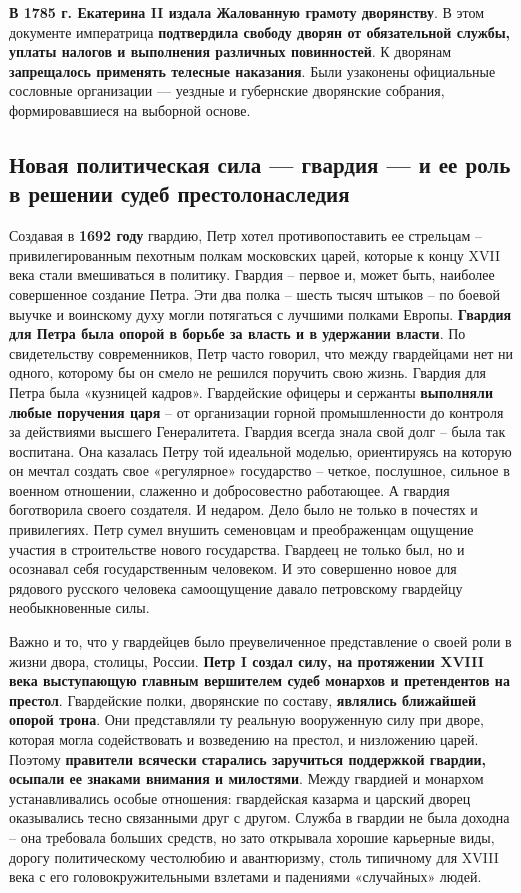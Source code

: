 \documentclass{article}
\begin{document}
\hfill

\textbf{В 1785 г. Екатерина II издала Жалованную грамоту дворянству}. В этом документе императрица \textbf{подтвердила свободу дворян от обязательной службы, уплаты налогов и выполнения различных повинностей}. К дворянам \textbf{запрещалось применять телесные наказания}. Были узаконены официальные   сословные организации — уездные и губернские дворянские собрания, формировавшиеся на выборной основе.

\subsection{Новая политическая сила — гвардия — и ее роль в решении судеб престолонаследия}

Создавая в \textbf{1692 году} гвардию, Петр хотел противопоставить ее стрельцам – привилегированным пехотным полкам московских царей, которые к концу XVII века стали вмешиваться в политику. Гвардия – первое и, может быть, наиболее совершенное создание Петра. Эти два полка – шесть тысяч штыков – по боевой выучке и воинскому духу могли потягаться с лучшими полками Европы. \textbf{Гвардия для Петра была опорой в борьбе за власть и в удержании власти}. По свидетельству современников, Петр часто говорил, что между гвардейцами нет ни одного, которому бы он смело не решился поручить свою жизнь. Гвардия для Петра была «кузницей кадров». Гвардейские офицеры и сержанты \textbf{выполняли любые поручения царя} – от организации горной промышленности до контроля за действиями высшего Генералитета. Гвардия всегда знала свой долг – была так воспитана. Она казалась Петру той идеальной моделью, ориентируясь на которую он мечтал создать свое «регулярное» государство – четкое, послушное, сильное в военном отношении, слаженно и добросовестно работающее. А гвардия боготворила своего создателя. И недаром. Дело было не только в почестях и привилегиях. Петр сумел внушить семеновцам и преображенцам ощущение участия в строительстве нового государства. Гвардеец не только был, но и осознавал себя государственным человеком. И это совершенно новое для рядового русского человека самоощущение давало петровскому гвардейцу необыкновенные силы.

\hfill

Важно и то, что у гвардейцев было преувеличенное представление о своей роли в жизни двора, столицы, России. \textbf{Петр I создал силу, на протяжении XVIII века выступающую главным вершителем судеб монархов и претендентов на престол}. Гвардейские полки, дворянские по составу, \textbf{являлись ближайшей опорой трона}. Они представляли ту реальную вооруженную силу при дворе, которая могла содействовать и возведению на престол, и низложению царей. Поэтому \textbf{правители всячески старались заручиться поддержкой гвардии, осыпали ее знаками внимания и милостями}. Между гвардией и монархом устанавливались особые отношения: гвардейская казарма и царский дворец оказывались тесно связанными друг с другом. Служба в гвардии не была доходна – она требовала больших средств, но зато открывала хорошие карьерные виды, дорогу политическому честолюбию и авантюризму, столь типичному для XVIII века с его головокружительными взлетами и падениями «случайных» людей.
\end{document}
